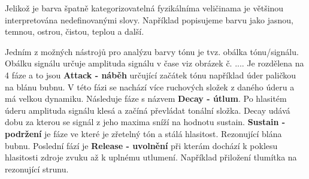   Jelikož je barva špatně kategorizovatelná fyzikálníma veličinama je většinou interpretována nedefinovanými slovy.
  Například popisujeme barvu jako jasnou, temnou, ostrou, čistou, teplou a další.

  Jedním z možných nástrojů pro analýzu barvy tónu je tvz. obálka tónu/signálu.
  Obálku signálu určuje amplituda signálu v čase viz obrázek č. ....%
  Je rozdělena na 4 fáze a to jsou \textbf{Attack - náběh} určující začátek tónu například úder paličkou na blánu bubnu.
  V této fázi se nachází více ruchových složek z daného úderu a má velkou dynamiku.
  Následuje fáze s názvem \textbf{Decay - útlum}.
  Po hlasitém úderu amplituda signálu klesá a začíná převládat tonální složka. Decay udává dobu za kterou se signál z jeho maxima sníží na hodnotu sustain.
  \textbf{Sustain - podržení} je fáze ve které je zřetelný tón a stálá hlasitost. Rezonující blána bubnu.
  Poslední fází je \textbf{Release - uvolnění} při kterám dochází k poklesu hlasitosti zdroje zvuku až k uplnému utlumení.
  Například přiložení tlumítka na rezonující strunu.

